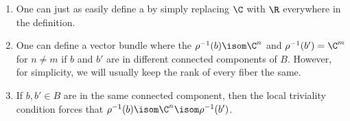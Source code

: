 \documentclass[11pt,leqno,oneside]{amsbook}
\numberwithin{thm}{section}
\begin{document}
\begin{rmk}
  \begin{enumerate}
  \item One can just as easily define a  by
    simply replacing \(\C\) with \(\R\) everywhere in the definition.
  \item One can define a vector bundle where the \(\rho^{-1}(b) \isom
    \C^n\) and \(\rho^{-1}(b') = \C^m\) for \(n \neq m\) if \(b\) and
    \(b'\) are in different connected components of \(B\). However,
    for simplicity, we will usually keep the rank of every fiber the
    same.
  \item If \(b,b' \in B\) are in the same connected component, then
    the local triviality condition forces that \(\rho^{-1}(b) \isom
    \C^n \isom \rho^{-1}(b')\).
  \end{enumerate}
\end{rmk}
\end{document}
